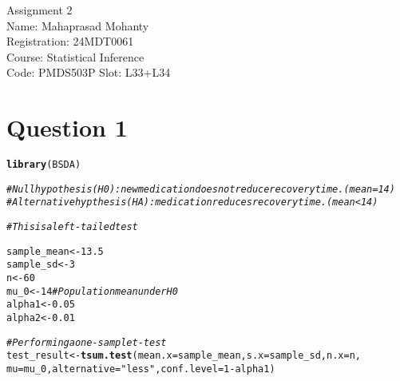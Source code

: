 \documentclass{article}\usepackage[]{graphicx}\usepackage[]{xcolor}
\makeatletter
\newcommand{\hlnum}[1]{\textcolor[rgb]{0.686,0.059,0.569}{#1}}%
\newcommand{\hlsng}[1]{\textcolor[rgb]{0.192,0.494,0.8}{#1}}%
\newcommand{\hlcom}[1]{\textcolor[rgb]{0.678,0.584,0.686}{\textit{#1}}}%
\newcommand{\hlopt}[1]{\textcolor[rgb]{0,0,0}{#1}}%
\newcommand{\hldef}[1]{\textcolor[rgb]{0.345,0.345,0.345}{#1}}%
\newcommand{\hlkwb}[1]{\textcolor[rgb]{0.69,0.353,0.396}{#1}}%
\newcommand{\hlkwc}[1]{\textcolor[rgb]{0.333,0.667,0.333}{#1}}%
\newcommand{\hlkwd}[1]{\textcolor[rgb]{0.737,0.353,0.396}{\textbf{#1}}}%
\newenvironment{kframe}{%
 \def\at@end@of@kframe{}%
 \ifinner\ifhmode%
  \def\at@end@of@kframe{\end{minipage}}%
  \begin{minipage}{\columnwidth}%
 \fi\fi%
 \def\FrameCommand##1{\hskip\@totalleftmargin \hskip-\fboxsep
 \colorbox{shadecolor}{##1}\hskip-\fboxsep
     \hskip-\linewidth \hskip-\@totalleftmargin \hskip\columnwidth}%
 \MakeFramed {\advance\hsize-\width
   \@totalleftmargin\z@ \linewidth\hsize
   \@setminipage}}%
 {\par\unskip\endMakeFramed%
 \at@end@of@kframe}
\newenvironment{knitrout}{}{} %
\makeatother
\begin{document}
\begin{center}
Assignment 2 \\
Name: Mahaprasad Mohanty \\
Registration: 24MDT0061 \\
Course: Statistical Inference \\
Code: PMDS503P
Slot: L33+L34
\end{center}

\section{Question 1}
\begin{knitrout}
\color{fgcolor}\begin{kframe}
\begin{alltt}
\hlkwd{library}\hldef{(BSDA)}
\end{alltt}


{\ttfamily\noindent\itshape\color{messagecolor}{\#\# Loading required package: lattice}}

{\ttfamily\noindent\itshape\color{messagecolor}{\#\# \\\#\# Attaching package: 'BSDA'}}

{\ttfamily\noindent\itshape\color{messagecolor}{\#\# The following object is masked from 'package:datasets':\\\#\# \\\#\# \ \ \ \ Orange}}\begin{alltt}
\hlcom{# Null hypothesis(H0): new medication does not reduce recovery time. (mean = 14)}
\hlcom{# Alternative hypthesis (HA): medication reduces recovery time. (mean < 14)}

\hlcom{# This is a left-tailed test}

\hldef{sample_mean} \hlkwb{<-} \hlnum{13.5}
\hldef{sample_sd} \hlkwb{<-} \hlnum{3}
\hldef{n} \hlkwb{<-} \hlnum{60}
\hldef{mu_0} \hlkwb{<-} \hlnum{14}  \hlcom{# Population mean under H0}
\hldef{alpha1} \hlkwb{<-} \hlnum{0.05}
\hldef{alpha2} \hlkwb{<-} \hlnum{0.01}

\hlcom{# Performing a one-sample t-test}
\hldef{test_result} \hlkwb{<-} \hlkwd{tsum.test}\hldef{(}\hlkwc{mean.x} \hldef{= sample_mean,} \hlkwc{s.x} \hldef{= sample_sd,} \hlkwc{n.x} \hldef{= n,}
                         \hlkwc{mu} \hldef{= mu_0,} \hlkwc{alternative} \hldef{=} \hlsng{"less"}\hldef{,} \hlkwc{conf.level} \hldef{=} \hlnum{1}\hlopt{-}\hldef{alpha1)}
\end{alltt}



\end{kframe}
\end{knitrout}
\end{document}
